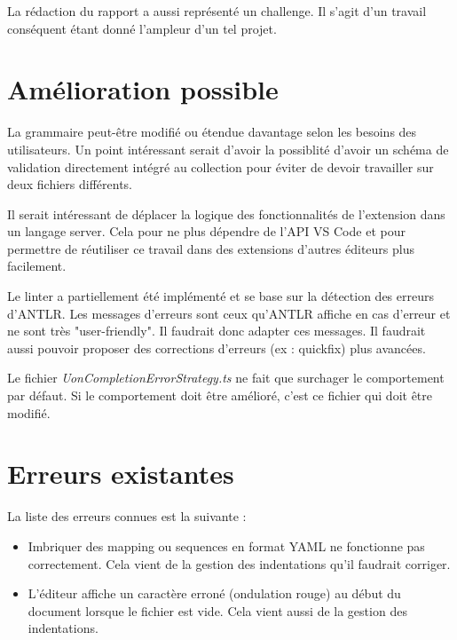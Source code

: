 \documentclass[
    iict, %
    il, %
]{heig-tb}
\begin{document}
La rédaction du rapport a aussi représenté un challenge. Il s'agit d'un travail conséquent étant donné l'ampleur d'un tel projet.

\section{Amélioration possible}

La grammaire peut-être modifié ou étendue davantage selon les besoins des utilisateurs.
Un point intéressant serait d'avoir la possiblité d'avoir un schéma de validation directement intégré au collection pour éviter de devoir travailler sur deux fichiers différents.

Il serait intéressant de déplacer la logique des fonctionnalités de l'extension dans un langage server. Cela pour ne plus dépendre de l'API VS Code et pour permettre de réutiliser ce travail
dans des extensions d'autres éditeurs plus facilement.

Le linter a partiellement été implémenté et se base sur la détection des erreurs d'ANTLR.
Les messages d'erreurs sont ceux qu'ANTLR affiche en cas d'erreur et ne sont très "user-friendly". Il faudrait donc adapter ces messages.
Il faudrait aussi pouvoir proposer des corrections d'erreurs (ex : quickfix) plus avancées.

Le fichier \emph{UonCompletionErrorStrategy.ts} ne fait que surchager le comportement par défaut. Si le comportement doit être amélioré, c'est ce fichier qui doit être modifié.

\section{Erreurs existantes}

La liste des erreurs connues est la suivante :

\begin{itemize}
    \item Imbriquer des mapping ou sequences en format YAML ne fonctionne pas correctement. Cela vient de la gestion des indentations qu'il faudrait corriger.
    \item L'éditeur affiche un caractère erroné (ondulation rouge) au début du document lorsque le fichier est vide. Cela vient aussi de la gestion des indentations.
\end{itemize}





\label{glossaire}
\printnoidxglossary
{}

\printbibliography
{}

\end{document}
